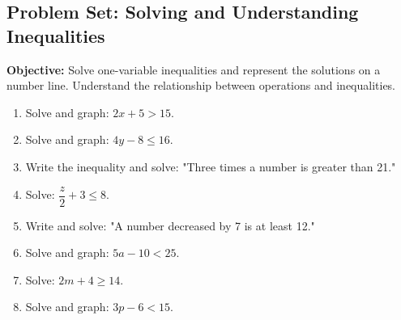 \documentclass[12pt]{article}
\title{}
\date{}
\begin{document}
\subsection*{Problem Set: Solving and Understanding Inequalities}
\onehalfspacing

\begin{tcolorbox}[colframe=black!40, colback=gray!5, 
coltitle=black, colbacktitle=black!20, fonttitle=\bfseries\Large, 
title=Learning Objective, halign title=center, left=5pt, right=5pt, top=5pt, bottom=15pt]
\textbf{Objective:} Solve one-variable inequalities and represent the solutions on a number line. Understand the relationship between operations and inequalities.
\end{tcolorbox}

\begin{tcolorbox}[colframe=black!60, colback=white, 
coltitle=black, colbacktitle=black!15, fonttitle=\bfseries\Large, 
title=Exercises, halign title=center, left=10pt, right=10pt, top=10pt, bottom=60pt]
\begin{enumerate}[itemsep=3em]
    \item Solve and graph: \( 2x + 5 > 15 \).
    \item Solve and graph: \( 4y - 8 \leq 16 \).
    \item Write the inequality and solve: "Three times a number is greater than 21."
    \item Solve: \( \dfrac{z}{2} + 3 \leq 8 \).
    \item Write and solve: "A number decreased by 7 is at least 12."
    \item Solve and graph: \( 5a - 10 < 25 \).
    \item Solve: \( 2m + 4 \geq 14 \).
    \item Solve and graph: \( 3p - 6 < 15 \).
\end{enumerate}
\end{tcolorbox}

\vspace{1em}
\end{document}
